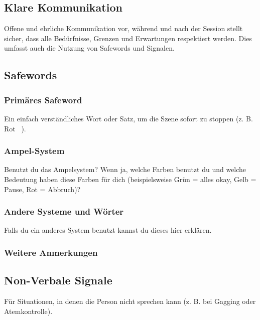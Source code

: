 \documentclass[a4paper,12pt]{article}
\begin{document}
 \subsection{Klare Kommunikation}
Offene und ehrliche Kommunikation vor, während und nach der Session stellt sicher, dass alle Bedürfnisse, Grenzen und Erwartungen respektiert werden. Dies umfasst auch die Nutzung von Safewords und Signalen.
\newpage

\subsection{Safewords}
\subsubsection{Primäres Safeword}
\noindent Ein einfach verständliches Wort oder Satz, um die Szene sofort zu stoppen (z. B. \glqq Rot \grqq\ ). \newline
\noindent \TextField[name=SafewordWord,multiline=true,height=3em, width=37em]{}

\subsubsection{Ampel-System}
\noindent Benutzt du das Ampelsystem? Wenn ja, welche Farben benutzt du und welche Bedeutung haben diese Farben für dich (beispielsweise Grün = alles okay, Gelb = Pause, Rot = Abbruch)? \newline
\noindent \TextField[name=SafewordFarben,multiline=true,height=5em, width=37em]{}

\subsubsection{Andere Systeme und Wörter}
\noindent Falls du ein anderes System benutzt kannst du dieses hier erklären. \newline
\noindent \TextField[name=SafewordAnderesSystem,multiline=true,height=10em, width=37em]{}

\subsubsection{Weitere Anmerkungen}
\noindent \TextField[name=SafewordAnmerkungen,multiline=true,height=10em, width=37em]{}

\newpage
\subsection{Non-Verbale Signale}
Für Situationen, in denen die Person nicht sprechen kann (z. B. bei Gagging oder Atemkontrolle). 
\end{document}
